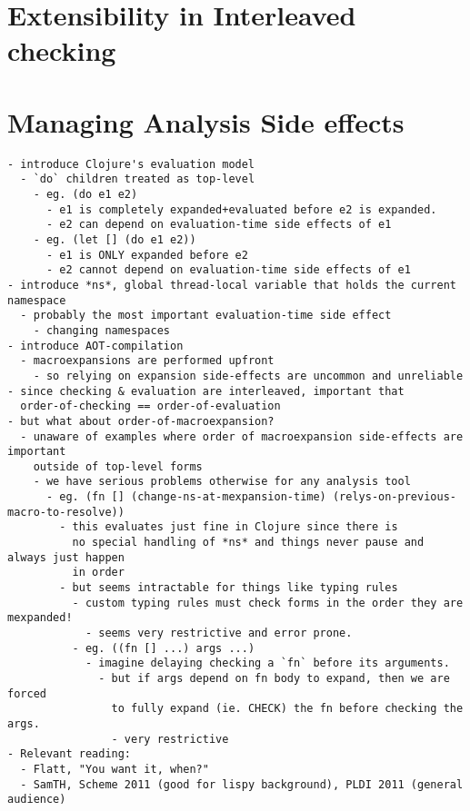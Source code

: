 \chapter{Extensibility in Interleaved checking}

\chapter{Managing Analysis Side effects}

{
\singlespacing
\begin{verbatim}
- introduce Clojure's evaluation model
  - `do` children treated as top-level
    - eg. (do e1 e2)
      - e1 is completely expanded+evaluated before e2 is expanded.
      - e2 can depend on evaluation-time side effects of e1
    - eg. (let [] (do e1 e2))
      - e1 is ONLY expanded before e2
      - e2 cannot depend on evaluation-time side effects of e1
- introduce *ns*, global thread-local variable that holds the current namespace
  - probably the most important evaluation-time side effect
    - changing namespaces
- introduce AOT-compilation
  - macroexpansions are performed upfront
    - so relying on expansion side-effects are uncommon and unreliable
- since checking & evaluation are interleaved, important that
  order-of-checking == order-of-evaluation
- but what about order-of-macroexpansion?
  - unaware of examples where order of macroexpansion side-effects are important
    outside of top-level forms
    - we have serious problems otherwise for any analysis tool
      - eg. (fn [] (change-ns-at-mexpansion-time) (relys-on-previous-macro-to-resolve))
        - this evaluates just fine in Clojure since there is
          no special handling of *ns* and things never pause and always just happen
          in order
        - but seems intractable for things like typing rules
          - custom typing rules must check forms in the order they are mexpanded!
            - seems very restrictive and error prone.
          - eg. ((fn [] ...) args ...)
            - imagine delaying checking a `fn` before its arguments.
              - but if args depend on fn body to expand, then we are forced
                to fully expand (ie. CHECK) the fn before checking the args.
                - very restrictive
- Relevant reading:
  - Flatt, "You want it, when?"
  - SamTH, Scheme 2011 (good for lispy background), PLDI 2011 (general audience)
\end{verbatim}
}

